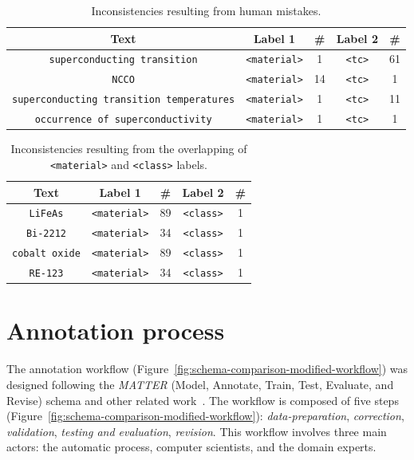 \begin{table}[htbp]
    \centering\small
    \caption{Inconsistencies resulting from human mistakes.}
     
    \begin{tabular}{ ccccc } 
    \toprule
        Text & Label 1 & \# & Label 2 & \#\\
    \midrule
        \texttt{superconducting transition}     &   \texttt{<material>}   &    1   &   \texttt{<tc>}  &   61   \\
        \texttt{NCCO}    &	\texttt{<material>}   &    14   &   \texttt{<tc>}  &   1   \\
        \texttt{superconducting transition temperatures}     &   \texttt{<material>}   &    1   &   \texttt{<tc>}  &   11   \\
        \texttt{occurrence of superconductivity}    &	\texttt{<material>}   &    1   &   \texttt{<tc>}  &   1   \\
    \bottomrule
    \end{tabular}
    \label{table:dataset-inconsistencies-unclear}
\end{table}

\begin{table}[htbp]
    \centering\small
    \caption{Inconsistencies resulting from the overlapping of \texttt{<material>} and \texttt{<class>} labels.}
    \begin{tabular}{ ccccc } 
    \toprule
        Text & Label 1 & \# & Label 2 & \#\\
    \midrule
        \texttt{LiFeAs}         &   \texttt{<material>}   &    89   &   \texttt{<class>}  &   1   \\
        \texttt{Bi-2212}        &	\texttt{<material>}   &    34   &   \texttt{<class>}  &   1   \\
        \texttt{cobalt oxide}   &   \texttt{<material>}   &    89   &   \texttt{<class>}  &   1   \\
        \texttt{RE-123}         &	\texttt{<material>}   &    34   &   \texttt{<class>}  &   1   \\
    \bottomrule
    \end{tabular}
    \label{table:dataset-inconsistencies-clear}
\end{table}



\section{Annotation process}
\label{subsec:annotation-workflow}
The annotation workflow (Figure~\ref{fig:schema-comparison-modified-workflow}) was designed following the \textit{MATTER} (Model, Annotate, Train, Test, Evaluate, and Revise) schema\cite{pustejovsky2012natural} and other related work~\cite{Dieb2016, Krallinger2015TheCC}.
The workflow is composed of five steps (Figure~\ref{fig:schema-comparison-modified-workflow}): \textit{data-preparation}, \textit{correction}, \textit{validation}, \textit{testing and evaluation}, \textit{revision}. 
This workflow involves three main actors: the automatic process, computer scientists, and the domain experts.


